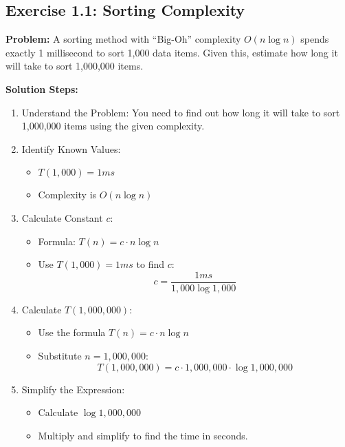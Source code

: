 
\subsection{Exercise 1.1: Sorting Complexity}
\textbf{Problem:} A sorting method with “Big-Oh” complexity $O(n \log n)$ spends exactly 1 millisecond to sort 1,000 data items. Given this, estimate how long it will take to sort 1,000,000 items.

\vspace{0.5em}
\textbf{Solution Steps:}
\begin{enumerate}[leftmargin=*,noitemsep]
    \item Understand the Problem: You need to find out how long it will take to sort 1,000,000 items using the given complexity.
    \item Identify Known Values:
    \begin{itemize}
        \item $T(1,000) = 1ms$
        \item Complexity is $O(n \log n)$
    \end{itemize}
    \item Calculate Constant $c$:
    \begin{itemize}
        \item Formula: $T(n) = c \cdot n \log n$
        \item Use $T(1,000) = 1ms$ to find $c$:
        \[ c = \frac{1ms}{1,000 \log 1,000} \]
    \end{itemize}
    \item Calculate $T(1,000,000)$:
    \begin{itemize}
        \item Use the formula $T(n) = c \cdot n \log n$
        \item Substitute $n = 1,000,000$:
        \[ T(1,000,000) = c \cdot 1,000,000 \cdot \log 1,000,000 \]
    \end{itemize}
    \item Simplify the Expression:
    \begin{itemize}
        \item Calculate $\log 1,000,000$
        \item Multiply and simplify to find the time in seconds.
    \end{itemize}
\end{enumerate}

